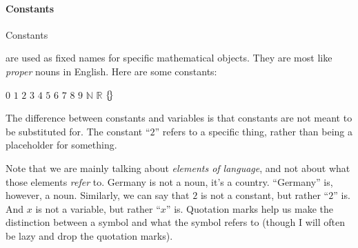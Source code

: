 \documentclass[12pt]{article}
\def\N{\mathbb{N}}
\def\R{\mathbb{R}}
\renewcommand{\emptyset}{\{\hspace{-2pt}\}}
\begin{document}
\paragraph{Constants}
\hypertarget{hl:constants}{Constants} are used as fixed names for specific mathematical objects.
They are most like \emph{proper} nouns in English.
Here are some constants:
\begin{center}
$0$ \sp $1$ \sp $2$ \sp $3$ \sp $4$ \sp $5$ \sp $6$ \sp $7$ \sp $8$ \sp $9$ \sp $\N$ \sp $\R$ \sp $\emptyset$
\end{center}
The difference between constants and variables is that constants are not meant to be substituted for.
The constant ``$2$'' refers to a specific thing, rather than being a placeholder for something.


Note that we are mainly talking about \emph{elements of language}, and not about what those elements \emph{refer} to.
Germany is not a noun, it's a country. ``Germany'' is, however, a noun.
Similarly, we can say that $2$ is not a constant, but rather ``$2$'' is.
And $x$ is not a variable, but rather ``$x$'' is.
Quotation marks help us make the distinction between a symbol and what the symbol refers to
(though I will often be lazy and drop the quotation marks).




\def\sp{\hspace{1em}}
\end{document}
